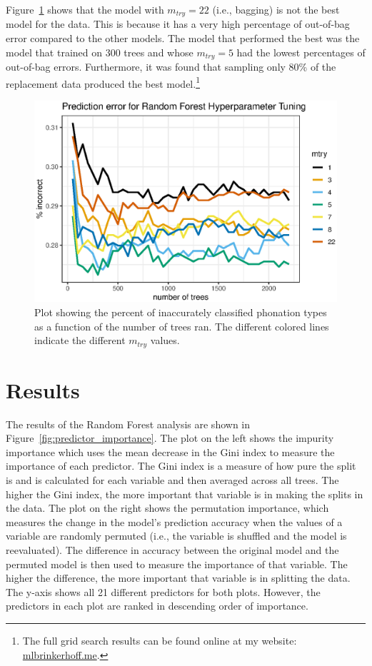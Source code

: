Figure~\ref{fig:mtry_number} shows that the model with $m_{try} = 22$ (i.e., bagging) is not the best model for the data. This is because it has a very high percentage of out-of-bag error compared to the other models. The model that performed the best was the model that trained on 300 trees and whose $m_{try} = 5$ had the lowest percentages of out-of-bag errors. Furthermore, it was found that sampling only 80\% of the replacement data produced the best model.\footnote{The full grid search results can be found online at my website: \href{mlbrinkerhoff.me}{mlbrinkerhoff.me}.}

\begin{figure}[h!]
    \centering
    \includegraphics[width = 0.9\linewidth]{images/RandomForest/tree_num_dur.eps}
    \caption{Plot showing the percent of inaccurately classified phonation types as a function of the number of trees ran. The different colored lines indicate the different $m_{try}$ values.}
    \label{fig:mtry_number}
\end{figure}

\section{Results} \label{sec:dt_results}

The results of the Random Forest analysis are shown in Figure~\ref{fig:predictor_importance}. The plot on the left shows the impurity importance which uses the mean decrease in the Gini index to measure the importance of each predictor. The Gini index is a measure of how pure the split is and is calculated for each variable and then averaged across all trees. The higher the Gini index, the more important that variable is in making the splits in the data. The plot on the right shows the permutation importance, which measures the change in the model's prediction accuracy when the values of a variable are randomly permuted (i.e., the variable is shuffled and the model is reevaluated). The difference in accuracy between the original model and the permuted model is then used to measure the importance of that variable. The higher the difference, the more important that variable is in splitting the data. The y-axis shows all 21 different predictors for both plots. However, the predictors in each plot are ranked in descending order of importance. 

